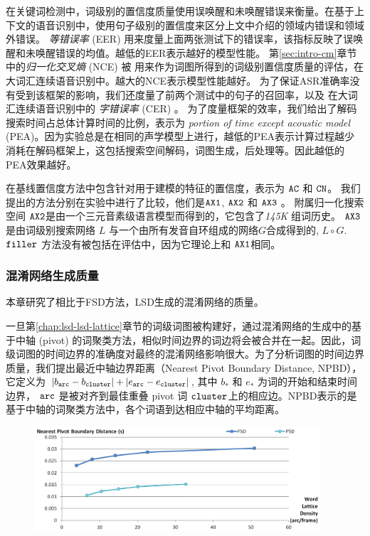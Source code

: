在关键词检测中，词级别的置信度质量使用误唤醒和未唤醒错误来衡量。在基于上下文的语音识别中，使用句子级别的置信度来区分上文中介绍的领域内错误和领域外错误。
 {\em 等错误率} (EER) 用来度量上面两张测试下的错误率，该指标反映了误唤醒和未唤醒错误的均值。越低的EER表示越好的模型性能。
 第\ref{sec:intro-cm}章节中的{\em 归一化交叉熵 } (NCE) \cite{zhc00-chen-icassp2017}被 用来作为词图所得到的词级别置信度质量的评估，在大词汇连续语音识别中。越大的NCE表示模型性能越好。
为了保证ASR准确率没有受到该框架的影响，我们还度量了前两个测试中的句子的召回率，以及 在大词汇连续语音识别中的 {\em 字错误率} (CER) 。 
 为了度量框架的效率，我们给出了解码搜索时间占总体计算时间的比例，表示为 {\em portion of time except acoustic model} (PEA)。因为实验总是在相同的声学模型上进行，越低的PEA表示计算过程越少消耗在解码框架上，这包括搜索空间解码，词图生成，后处理等。因此越低的PEA效果越好。

 在基线置信度方法中包含针对用于建模的特征的置信度，表示为 $\tt AC $ 和 $ \tt CN $。 我们提出的方法分别在实验中进行了比较，他们是$\tt AX1 $, $\tt AX2 $ 和 $\tt AX3 $ 。 
 附属归一化搜索空间 $\tt AX2 $是由一个三元音素级语言模型而得到的，它包含了{\em 145K} 组词历史。 $\tt AX3 $ 是由词级别搜索网络 $L$ 与一个由所有发音自环组成的网络$G$合成得到的,  $L \circ G$. $\tt filler$ 方法没有被包括在评估中，因为它理论上和 $\tt AX1$相同。


\subsubsection{混淆网络生成质量}

本章研究了相比于FSD方法，LSD生成的混淆网络的质量。

一旦第\ref{chap:lsd-lsd-lattice}章节的词级词图被构建好，通过混淆网络的生成中的基于中轴 (pivot) 的词聚类方法，相似时间边界的词边将会被合并在一起。因此，词级词图的时间边界的准确度对最终的混淆网络影响很大。为了分析词图的时间边界质量，我们提出最近中轴边界距离（Nearest Pivot Boundary Distance, NPBD），它定义为 $|b_{\tt arc}-b_{\tt cluster}|+|e_{\tt arc}-e_{\tt cluster}|$, 其中 $b_*$ 和 $e_*$ 为词的开始和结束时间边界， $\tt arc$ 是被对齐到最佳重叠 pivot 词 $\tt cluster$上的相应边。NPBD表示的是基于中轴的词聚类方法中，各个词语到达相应中轴的平均距离。


\begin{figure}[htb]
  \centering
    \captionstyle{\centering}
    \includegraphics[width=0.95\textwidth]{figure/bound-stable.png}
\end{figure}

